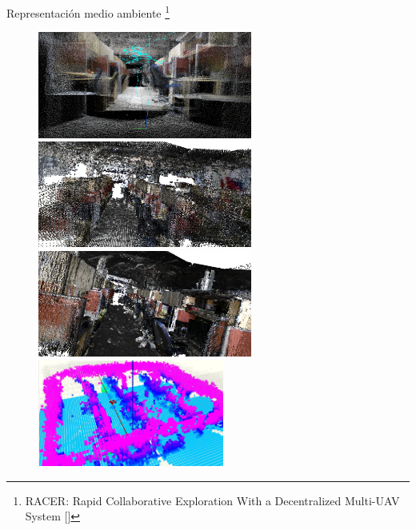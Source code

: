 \documentclass[
  24pt, %
  aspectratio=169, %
]{beamer}
\begin{document}
\begin{frame}{Representación medio ambiente \footnote{RACER: Rapid Collaborative Exploration With a Decentralized Multi-UAV System [\cite{RACER2022}]}}
  \begin{figure}[ht!]
    \centering
    \begin{minipage}{0.48\textwidth}
      \centering
      \includegraphics[width=\linewidth,height=3.5cm]{ROS_MAP2} %
    \end{minipage}\hfill
    \begin{minipage}{0.48\textwidth}
      \centering
      \includegraphics[width=\linewidth,height=3.5cm]{ROS_MAP3} %
    \end{minipage}
    \vspace{-0.2cm} %
    \begin{minipage}{0.48\textwidth}
      \centering
      \includegraphics[width=\linewidth,height=3.5cm]{ROS_MAP4} %
    \end{minipage}\hfill
    \begin{minipage}{0.48\textwidth}
      \centering
      \includegraphics[width=\linewidth,height=3.5cm]{ROS_MAP6} %
    \end{minipage}
  \end{figure}
\end{frame}
\end{document}

